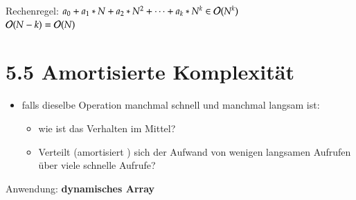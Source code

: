 Rechenregel: $a_0 + a_1 * N + a_2 * N^2 + \cdots + a_k * N^k \in \mathcal{O}{}(N^k)$ \\
    \hspace*{3cm} $\mathcal{O}{}(N-k) = \mathcal{O}{}(N)$


\section*{5.5 Amortisierte Komplexität}
\begin{itemize}
    \item falls dieselbe Operation manchmal schnell und manchmal langsam ist:
    \begin{itemize}
        \item wie ist das Verhalten im Mittel?
        \item Verteilt (\glqq amortisiert \grqq) sich der Aufwand von wenigen langsamen Aufrufen über viele schnelle Aufrufe?
    \end{itemize}
\end{itemize}
Anwendung: \textbf{dynamisches Array}
